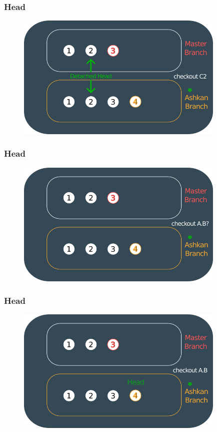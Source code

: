 \documentclass{beamer}
\begin{document}
	\begin{frame}
		\frametitle{Head}
		\begin{figure}[htbp]
			\centering
			\includegraphics[width=10cm]{head10}
		\end{figure}
	\end{frame}
	
	\begin{frame}
		\frametitle{Head}
		\begin{figure}[htbp]
			\centering
			\includegraphics[width=10cm]{head11}
		\end{figure}
	\end{frame}
	
	\begin{frame}
		\frametitle{Head}
		\begin{figure}[htbp]
			\centering
			\includegraphics[width=10cm]{head12}
		\end{figure}
	\end{frame}
	
\end{document}

